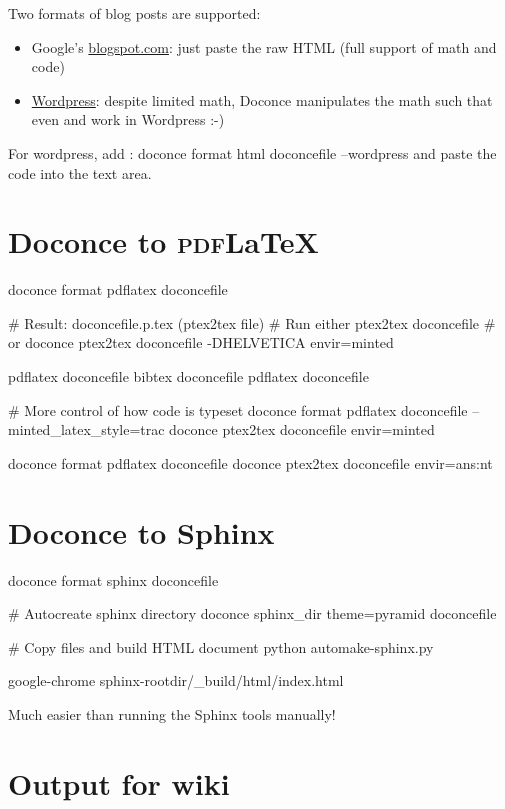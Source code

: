 \documentclass[%
twoside,                 %
draft,                   %
final,                   %
chapterprefix=true,      %
open=right               %
10pt]{book}
\newcounter{doconce:movie:counter}
\newcounter{doconce:exercise:counter}
\begin{document}
\begin{shadedquoteBlue}
Two formats of blog posts are supported:

\begin{itemize}
 \item Google's \href{{http://doconce-report-demo.blogspot.no/}}{blogspot.com}:
   just paste the raw HTML (full support of math and code)

 \item \href{{http://doconcereportdemo.wordpress.com/}}{Wordpress}:
   despite limited math, Doconce manipulates the math
   such that even  and  work in Wordpress :-)
\end{itemize}

\noindent
For wordpress, add :
\bccq
doconce format html doconcefile --wordpress
\eccq
and paste the code into the text area.



\section*{Doconce to \textsc{pdf}{\LaTeX}}

\bccq
doconce format pdflatex doconcefile

# Result: doconcefile.p.tex (ptex2tex file)
# Run either
ptex2tex doconcefile
# or
doconce ptex2tex doconcefile -DHELVETICA envir=minted

pdflatex doconcefile
bibtex doconcefile
pdflatex doconcefile

# More control of how code is typeset
doconce format pdflatex doconcefile --minted_latex_style=trac
doconce ptex2tex doconcefile envir=minted

doconce format pdflatex doconcefile
doconce ptex2tex doconcefile envir=ans:nt
\eccq

\section*{Doconce to Sphinx}

\bccq
doconce format sphinx doconcefile

# Autocreate sphinx directory
doconce sphinx_dir theme=pyramid doconcefile

# Copy files and build HTML document
python automake-sphinx.py

google-chrome sphinx-rootdir/_build/html/index.html
\eccq

Much easier than running the Sphinx tools manually!

\section*{Output for wiki}


\end{shadedquoteBlue}
\end{document}

